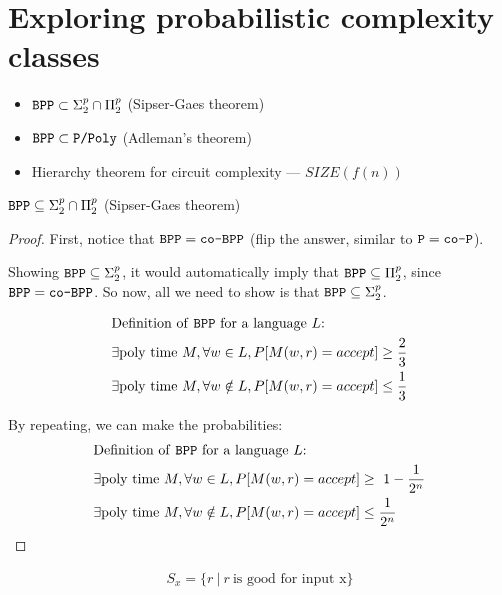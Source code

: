 \newcommand{\cobpp}{\texttt{co-BPP}}
\newcommand{\ip}{\texttt{IP}}
\newcommand{\zkp}{\texttt{ZKP}}
\chapter{Exploring probabilistic complexity classes}

\begin{itemize}
    \item $\texttt{BPP} \subset \Sigma^p_2 \cap \Pi^p_2$ (Sipser-Gaes theorem)
    \item $\texttt{BPP} \subset \texttt{P/Poly}$ (Adleman's theorem)
    \item Hierarchy theorem for circuit complexity --- $SIZE(f(n))$
\end{itemize}


\begin{theorem}
    $\texttt{BPP} \subseteq \Sigma^p_2 \cap \Pi^p_2$ (Sipser-Gaes theorem)
\end{theorem}
\begin{proof}
    First, notice that $\bpp = \cobpp$ (flip the answer, similar to $\texttt{P} = \texttt{co-P}$).

    Showing $\texttt{BPP} \subseteq \Sigma_2^p$, it would automatically imply that $\texttt{BPP} \subseteq \Pi_2^p$,
    since $\bpp = \cobpp$.
    So now, all we need to show is that $\texttt{BPP} \subseteq \Sigma_2^p$.

    \begin{align*}
    &\text{Definition of \texttt{BPP}~for a language $L$:} \\
    &\exists \text{poly time}~M, \forall w \in L, P[M(w, r) = accept] \geq \frac{2}{3} \\
    &\exists \text{poly time}~M, \forall w \notin L, P[M(w, r) = accept] \leq \frac{1}{3}
    \end{align*}

    By repeating, we can make the probabilities:
    \begin{align*}
    &\text{Definition of \texttt{BPP}~for a language $L$:} \\
    &\exists \text{poly time}~M, \forall w \in L, P[M(w, r) = accept] \geq \ 1 - \frac{1}{2^n} \\
    &\exists \text{poly time}~M, \forall w \notin L, P[M(w, r) = accept] \leq \frac{1}{2^n}
    \end{align*}
\end{proof}

\begin{align*}
    S_x = \{ r~\vert~ r~\text{is good for input x} \}
\end{align*}

